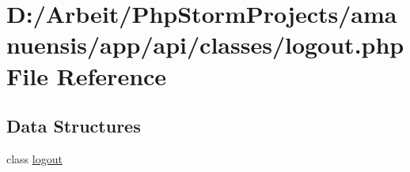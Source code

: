 \hypertarget{logout_8php}{}\section{D\+:/\+Arbeit/\+Php\+Storm\+Projects/amanuensis/app/api/classes/logout.php File Reference}
\label{logout_8php}
\subsection*{Data Structures}
\begin{DoxyCompactItemize}
\item 
class \hyperlink{classlogout}{logout}
\end{DoxyCompactItemize}
